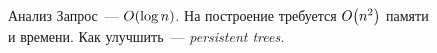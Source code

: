 \begin{frame}{Анализ}
	Запрос~— \(O\lr*{\log n}\). На построение требуется \(O\lr*{n^2}\) памяти \\
	и времени. Как улучшить~— {\it persistent trees.}
	\vspace{-1mm}

  \begin{center}  \end{center}
\end{frame}
